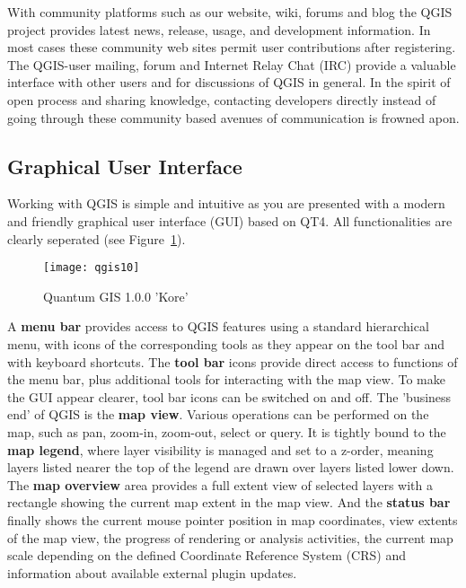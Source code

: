 With community platforms such as our website, wiki, forums and blog the QGIS project
provides latest news, release, usage, and development information. In most cases 
these community web sites permit user contributions after registering. 
The QGIS-user mailing, forum and Internet Relay Chat (IRC) provide a valuable interface 
with other users and for discussions of QGIS in general. In the spirit of open 
process and sharing knowledge, contacting developers directly instead of going through 
these community based avenues of communication is frowned apon.

\subsection{Graphical User Interface}

Working with QGIS is simple and intuitive as you are presented with a
modern and friendly graphical user interface (GUI) based on QT4. All
functionalities are clearly seperated (see Figure~\ref{fig:qgis10}).

\begin{figure}[h]
   \begin{center}
   \caption{Quantum GIS 1.0.0 'Kore'}\label{fig:qgis10}\smallskip
   \texttt{[image: qgis10]}
\end{center}
\end{figure}

A \textbf{menu bar} provides access to QGIS features using a standard
hierarchical menu, with icons of the corresponding tools as they appear on
the tool bar and with keyboard shortcuts. The \textbf{tool bar} icons provide
direct access to functions of the menu bar, plus additional tools for
interacting with the map view. To make the GUI appear clearer, tool bar icons
can be switched on and off. The 'business end' of QGIS is the \textbf{map
view}. Various operations can be performed on the map, such as pan, zoom-in,
zoom-out, select or query. It is tightly bound to the \textbf{map legend},
where layer visibility is managed and set to a z-order, meaning layers
listed nearer the top of the legend are drawn over layers listed lower down.
The \textbf{map overview} area provides a full extent view of selected layers
with a rectangle showing the current map extent in the map view. And the
\textbf{status bar} finally shows the current mouse pointer position in map
coordinates, view extents of the map view, the progress of rendering or
analysis activities, the current map scale depending on the defined
Coordinate Reference System (CRS) and information about available external
plugin updates.    

